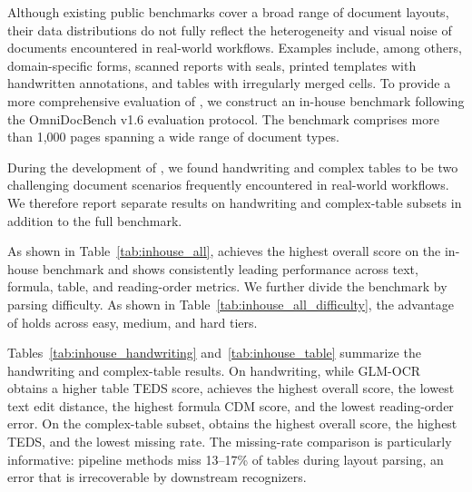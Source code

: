 Although existing public benchmarks cover a broad range of document layouts, their data distributions do not fully reflect the heterogeneity and visual noise of documents encountered in real-world workflows. Examples include, among others, domain-specific forms, scanned reports with seals, printed templates with handwritten annotations, and tables with irregularly merged cells. To provide a more comprehensive evaluation of \ours{}, we construct an in-house benchmark following the OmniDocBench v1.6 evaluation protocol. The benchmark comprises more than 1,000 pages spanning a wide range of document types.

During the development of \ours{}, we found handwriting and complex tables to be two challenging document scenarios frequently encountered in real-world workflows. We therefore report separate results on handwriting and complex-table subsets in addition to the full benchmark.

As shown in Table~\ref{tab:inhouse_all}, \ours{} achieves the highest overall score on the in-house benchmark and shows consistently leading performance across text, formula, table, and reading-order metrics. We further divide the benchmark by parsing difficulty. As shown in Table~\ref{tab:inhouse_all_difficulty}, the advantage of \ours{} holds across easy, medium, and hard tiers.

Tables~\ref{tab:inhouse_handwriting} and~\ref{tab:inhouse_table} summarize the handwriting and complex-table results. On handwriting, while GLM-OCR obtains a higher table TEDS score, \ours{} achieves the highest overall score, the lowest text edit distance, the highest formula CDM score, and the lowest reading-order error. On the complex-table subset, \ours{} obtains the highest overall score, the highest TEDS, and the lowest missing rate. The missing-rate comparison is particularly informative: pipeline methods miss 13--17\% of tables during layout parsing, an error that is irrecoverable by downstream recognizers.
